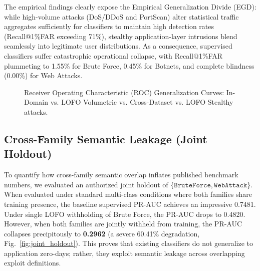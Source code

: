 \documentclass[conference,10pt,twocolumn]{IEEEtran}
\begin{document}
The empirical findings clearly expose the Empirical Generalization Divide (EGD): while high-volume attacks (DoS/DDoS and PortScan) alter statistical traffic aggregates sufficiently for classifiers to maintain high detection rates (Recall@1\%FAR exceeding 71\%), stealthy application-layer intrusions blend seamlessly into legitimate user distributions. As a consequence, supervised classifiers suffer catastrophic operational collapse, with Recall@1\%FAR plummeting to 1.55\% for Brute Force, 0.45\% for Botnets, and complete blindness (0.00\%) for Web Attacks.

\begin{figure}[!t]
\centering
{}
\caption{Receiver Operating Characteristic (ROC) Generalization Curves: In-Domain vs. LOFO Volumetric vs. Cross-Dataset vs. LOFO Stealthy attacks.}
\label{fig:roc_curves}
\end{figure}

\subsection{Cross-Family Semantic Leakage (Joint Holdout)}
To quantify how cross-family semantic overlap inflates published benchmark numbers, we evaluated an authorized joint holdout of $\{\texttt{BruteForce}, \texttt{WebAttack}\}$. When evaluated under standard multi-class conditions where both families share training presence, the baseline supervised PR-AUC achieves an impressive 0.7481. Under single LOFO withholding of Brute Force, the PR-AUC drops to 0.4820. However, when both families are jointly withheld from training, the PR-AUC collapses precipitously to \textbf{0.2962} (a severe 60.41\% degradation, Fig.~\ref{fig:joint_holdout}). This proves that existing classifiers do not generalize to application zero-days; rather, they exploit semantic leakage across overlapping exploit definitions.
\end{document}

